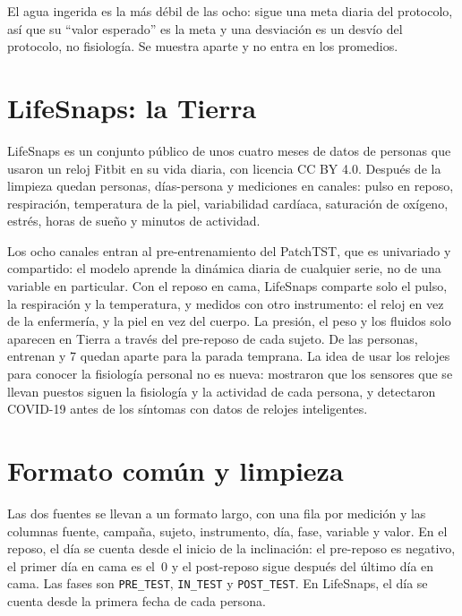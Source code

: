 El agua ingerida es la más débil de las ocho: sigue una meta diaria del protocolo, así que su \enquote{valor esperado}
es la meta y una desviación es un desvío del protocolo, no fisiología. Se muestra aparte y no entra en los promedios.

\section{LifeSnaps: la Tierra}

LifeSnaps \parencite{yfantidou2022} es un conjunto público de unos cuatro meses de datos de personas que usaron un reloj
Fitbit en su vida diaria, con licencia CC BY 4.0. Después de la limpieza quedan  personas,
 días-persona y  mediciones en 
canales: pulso en reposo, respiración, temperatura de la piel, variabilidad cardíaca, saturación de oxígeno, estrés,
horas de sueño y minutos de actividad.

Los ocho canales entran al pre-entrenamiento del PatchTST, que es univariado y compartido: el modelo aprende la
dinámica diaria de cualquier serie, no de una variable en particular. Con el reposo en cama, LifeSnaps comparte solo
el pulso, la respiración y la temperatura, y medidos con otro instrumento: el reloj en vez de la enfermería, y la piel
en vez del cuerpo. La presión, el peso y los fluidos solo aparecen en Tierra a través del pre-reposo de cada sujeto.
De las  personas,  entrenan y 7 quedan aparte para la parada
temprana. La idea de usar los relojes para conocer la fisiología personal no es nueva: \textcite{li2017} mostraron
que los sensores que se llevan puestos siguen la fisiología y la actividad de cada persona, y \textcite{mishra2020}
detectaron COVID-19 antes de los síntomas con datos de relojes inteligentes.

\section{Formato común y limpieza}

Las dos fuentes se llevan a un formato largo, con una fila por medición y las columnas fuente, campaña, sujeto,
instrumento, día, fase, variable y valor. En el reposo, el día se cuenta desde el inicio de la inclinación: el
pre-reposo es negativo, el primer día en cama es el~0 y el post-reposo sigue después del último día en cama. Las fases
son \texttt{PRE\_TEST}, \texttt{IN\_TEST} y \texttt{POST\_TEST}. En LifeSnaps, el día se cuenta desde la primera fecha
de cada persona.

